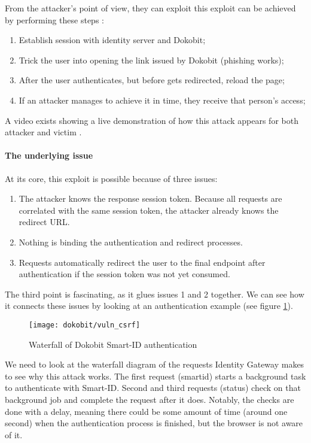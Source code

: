 From the attacker's point of view, they can exploit this exploit can be achieved by performing these steps \cite{video-exploitdokobit}:

\begin{enumerate}
  \item Establish session with identity server and Dokobit;
  \item Trick the user into opening the link issued by Dokobit (phishing works);
  \item After the user authenticates, but before gets redirected, reload the page;
  \item If an attacker manages to achieve it in time, they receive that person's access;
\end{enumerate}

A video exists showing a live demonstration of how this attack appears for both attacker and victim \cite{video-exploitdokobit}.

\paragraph{The underlying issue}

At its core, this exploit is possible because of three issues: 

\begin{enumerate}
  \item The attacker knows the response session token. Because all requests are correlated with the same session token, the attacker already knows the redirect URL.
  \item Nothing is binding the authentication and redirect processes.
  \item Requests automatically redirect the user to the final endpoint after authentication if the session token was not yet consumed.
\end{enumerate}

The third point is fascinating, as it glues issues 1 and 2 together. We can see how it connects these issues by looking at an authentication example (see figure \ref{fig:dokobit-vuln-csrf}).

\begin{figure}
  \centering
  \texttt{[image: dokobit/vuln\_csrf]}
  \caption{Waterfall of Dokobit Smart-ID authentication}
  \label{fig:dokobit-vuln-csrf}
\end{figure}

We need to look at the waterfall diagram of the requests Identity Gateway makes to see why this attack works. The first request ({smartid}) starts a background task to authenticate with Smart-ID. Second and third requests ({status}) check on that background job and complete the request after it does. Notably, the checks are done with a delay, meaning there could be some amount of time (around one second) when the authentication process is finished, but the browser is not aware of it.

